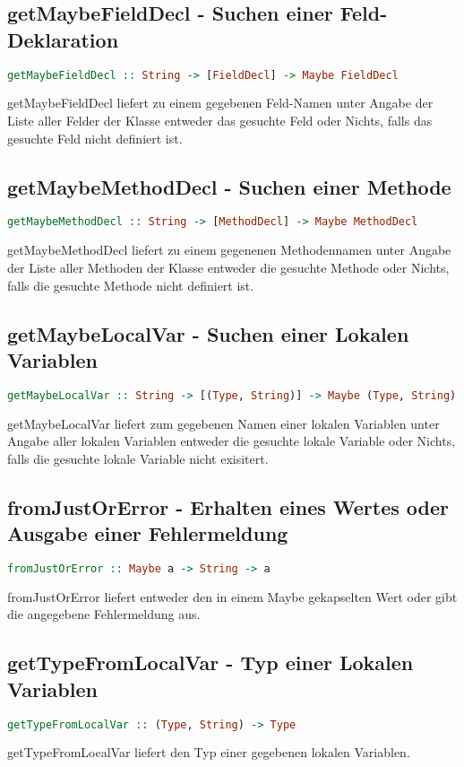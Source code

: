 \documentclass[a4paper,10pt]{article}
\begin{document}
\subsection{getMaybeFieldDecl - Suchen einer Feld-Deklaration}
\begin{lstlisting}[language=Haskell]
getMaybeFieldDecl :: String -> [FieldDecl] -> Maybe FieldDecl
\end{lstlisting}
getMaybeFieldDecl liefert zu einem gegebenen Feld-Namen unter Angabe der Liste aller Felder der Klasse entweder das gesuchte Feld oder Nichts,
falls das gesuchte Feld nicht definiert ist.
\\
\subsection{getMaybeMethodDecl - Suchen einer Methode}
\begin{lstlisting}[language=Haskell]
getMaybeMethodDecl :: String -> [MethodDecl] -> Maybe MethodDecl
\end{lstlisting}
getMaybeMethodDecl liefert zu einem gegenenen Methodennamen unter Angabe der Liste aller Methoden der Klasse entweder die gesuchte Methode oder Nichts,
falls die gesuchte Methode nicht definiert ist.
\\
\newpage
\subsection{getMaybeLocalVar - Suchen einer Lokalen Variablen}
\begin{lstlisting}[language=Haskell]
getMaybeLocalVar :: String -> [(Type, String)] -> Maybe (Type, String)
\end{lstlisting}
getMaybeLocalVar liefert zum gegebenen Namen einer lokalen Variablen unter Angabe aller lokalen Variablen entweder die gesuchte lokale Variable oder Nichts,
falls die gesuchte lokale Variable nicht exisitert.
\\
\subsection{fromJustOrError - Erhalten eines Wertes oder Ausgabe einer Fehlermeldung}
\begin{lstlisting}[language=Haskell]
fromJustOrError :: Maybe a -> String -> a
\end{lstlisting}
fromJustOrError liefert entweder den in einem Maybe gekapselten Wert oder gibt die angegebene Fehlermeldung aus.
\\
\subsection{getTypeFromLocalVar - Typ einer Lokalen Variablen}
\begin{lstlisting}[language=Haskell]
getTypeFromLocalVar :: (Type, String) -> Type
\end{lstlisting}
getTypeFromLocalVar liefert den Typ einer gegebenen lokalen Variablen.
\\
\end{document}
